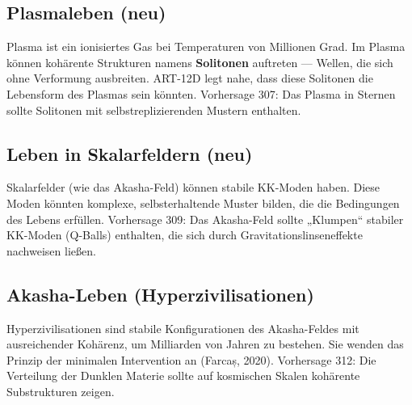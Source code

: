 \subsection{Plasmaleben (neu)}
Plasma ist ein ionisiertes Gas bei Temperaturen von Millionen Grad. Im Plasma können kohärente Strukturen namens \textbf{Solitonen} auftreten --- Wellen, die sich ohne Verformung ausbreiten. ART-12D legt nahe, dass diese Solitonen die Lebensform des Plasmas sein könnten. Vorhersage 307: Das Plasma in Sternen sollte Solitonen mit selbstreplizierenden Mustern enthalten.

\subsection{Leben in Skalarfeldern (neu)}
Skalarfelder (wie das Akasha-Feld) können stabile KK-Moden haben. Diese Moden könnten komplexe, selbsterhaltende Muster bilden, die die Bedingungen des Lebens erfüllen. Vorhersage 309: Das Akasha-Feld sollte „Klumpen`` stabiler KK-Moden (Q-Balls) enthalten, die sich durch Gravitationslinseneffekte nachweisen ließen.

\subsection{Akasha-Leben (Hyperzivilisationen)}
Hyperzivilisationen sind stabile Konfigurationen des Akasha-Feldes mit ausreichender Kohärenz, um Milliarden von Jahren zu bestehen. Sie wenden das Prinzip der minimalen Intervention an (Farcaș, 2020). Vorhersage 312: Die Verteilung der Dunklen Materie sollte auf kosmischen Skalen kohärente Substrukturen zeigen.

\newpage
